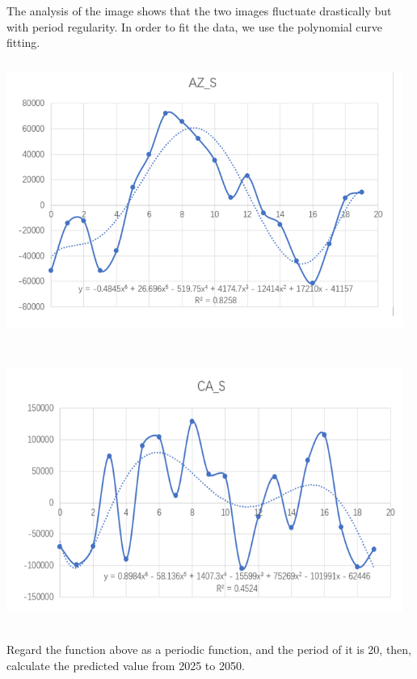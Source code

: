 \documentclass[12pt]{article}
\begin{document}
The analysis of the image shows that the two images fluctuate drastically but with period regularity. In order to fit the data, we use the polynomial curve fitting.

\includegraphics[width=13cm,height=9cm]{d2.png}

\includegraphics[width=13cm,height=9cm]{d3.png}

Regard the function above as a periodic function, and the period of it is 20, then, calculate the predicted value from 2025 to 2050.
\end{document}

